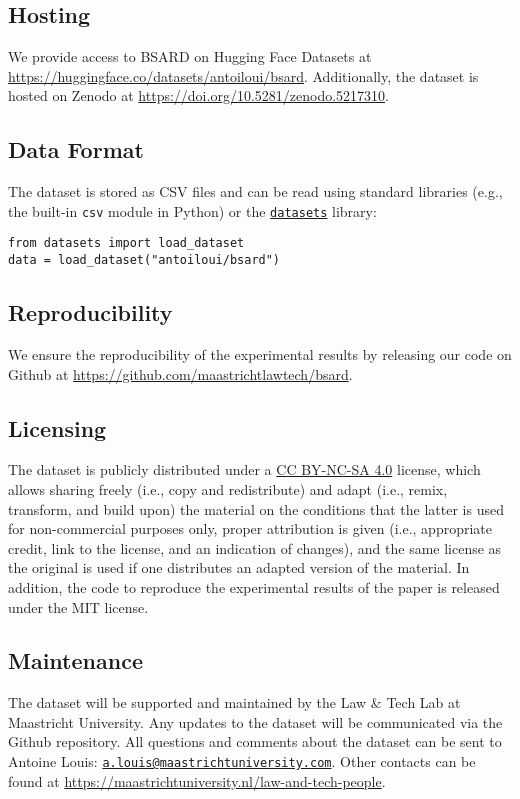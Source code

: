 \documentclass[11pt]{article}
\begin{document}
\subsection{Hosting}
We provide access to BSARD on Hugging Face Datasets \citep{lhoest2021datasets} at {\footnotesize \url{https://huggingface.co/datasets/antoiloui/bsard}}. Additionally, the dataset is hosted on Zenodo at {\footnotesize \url{https://doi.org/10.5281/zenodo.5217310}}.

\subsection{Data Format}
The dataset is stored as CSV files and can be read using standard libraries (e.g., the built-in \texttt{csv} module in Python) or the \href{https://pypi.org/project/datasets/}{\hf \texttt{datasets}} library:
\begin{lstlisting}[style=CEE]
from datasets import load_dataset
data = load_dataset("antoiloui/bsard")
\end{lstlisting}

\subsection{Reproducibility}
We ensure the reproducibility of the experimental results by releasing our code on Github at {\footnotesize \url{https://github.com/maastrichtlawtech/bsard}}.

\subsection{Licensing}
The dataset is publicly distributed under a \href{https://creativecommons.org/licenses/by-nc-sa/4.0/}{CC BY-NC-SA 4.0} license, which allows sharing freely (i.e., copy and redistribute) and adapt (i.e., remix, transform, and build upon) the material on the conditions that the latter is used for non-commercial purposes only, proper attribution is given (i.e., appropriate credit, link to the license, and an indication of changes), and the same license as the original is used if one distributes an adapted version of the material. In addition, the code to reproduce the experimental results of the paper is released under the MIT license.

\subsection{Maintenance}
The dataset will be supported and maintained by the Law \& Tech Lab at Maastricht University. Any updates to the dataset will be communicated via the Github repository. All questions and comments about the dataset can be sent to Antoine Louis: \href{mailto:}{\footnotesize \texttt{a.louis@maastrichtuniversity.com}}. Other contacts can be found at {\footnotesize \url{https://maastrichtuniversity.nl/law-and-tech-people}}.
\end{document}

